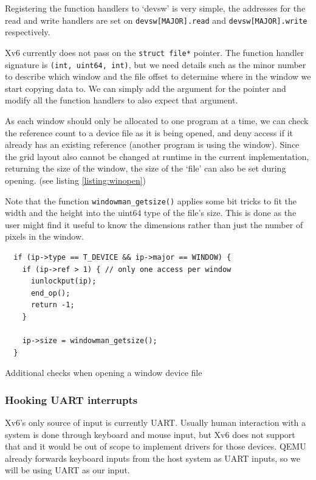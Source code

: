 Registering the function handlers to `devsw' is very simple, the addresses for
the read and write handlers are set on
\texttt{devsw[MAJOR].read} and 
\texttt{devsw[MAJOR].write} respectively.

Xv6 currently does not pass on the \texttt{struct file*} pointer.
The function handler signature is \texttt{(int, uint64, int)}, but we need
details such as the minor number to describe which window and 
the file offset to determine where in the window we start copying data to. We can
simply add the argument for the pointer and modify all the function handlers to 
also expect that argument.

As each window should only be allocated to one program at a time, we can check the
reference count to a device file as it is being opened, and deny access if it already
has an existing reference (another program is using the window).
Since the grid layout also cannot be changed at runtime in the current implementation,
returning the size of the window, the size of the `file' can also be set during opening.
(see listing \ref{listing:winopen})

Note that the function \texttt{windowman_getsize()} applies some bit tricks
to fit the width and the height into the uint64 type of the file's size. This is done
as the user might find it useful to know the dimensions rather than just the
number of pixels in the window.

\begin{listing}
    \begin{verbatim}
  if (ip->type == T_DEVICE && ip->major == WINDOW) {
    if (ip->ref > 1) { // only one access per window
      iunlockput(ip);
      end_op();
      return -1;
    }

    ip->size = windowman_getsize();
  }
    \end{verbatim}
    \caption{Additional checks when opening a window device file}
    \label{listing:winopen}
\end{listing}

\subsubsection{Hooking UART interrupts}
Xv6's only source of input is currently UART. Usually human interaction with
a system is done through keyboard and mouse input, but Xv6 does not support that
and it would be out of scope to implement drivers for those devices. QEMU already
forwards keyboard inputs from the host system as UART inputs, so we will be using
UART as our input.

